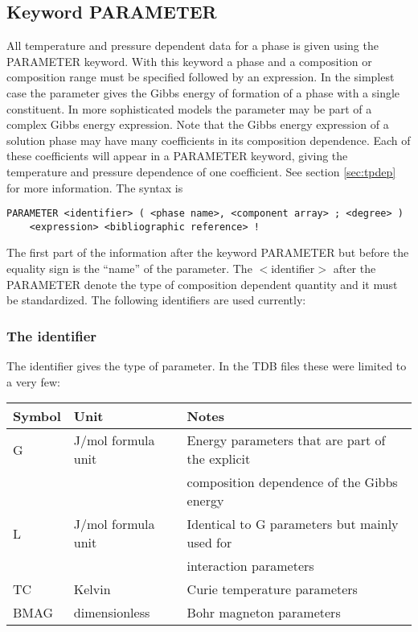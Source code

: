\documentclass[12pt]{article}
\begin{document}
\subsection{Keyword PARAMETER}\label{sec:parameter}

All temperature and pressure dependent data for a phase is given using
the PARAMETER keyword.  With this keyword a phase and a composition or
composition range must be specified followed by an expression.  In the
simplest case the parameter gives the Gibbs energy of formation of a
phase with a single constituent.  In more sophisticated models the
parameter may be part of a complex Gibbs energy expression.  Note that
the Gibbs energy expression of a solution phase may have many
coefficients in its composition dependence.  Each of these
coefficients will appear in a PARAMETER keyword, giving the
temperature and pressure dependence of one coefficient.  See section
\ref{sec:tpdep} for more information.  The syntax is

\begin{verbatim}
PARAMETER <identifier> ( <phase name>, <component array> ; <degree> )
    <expression> <bibliographic reference> !
\end{verbatim}

The first part of the information after the keyword PARAMETER but
before the equality sign is the ``name'' of the parameter.  The
$<$identifier$>$ after the PARAMETER denote the type of composition
dependent quantity and it must be standardized.  The following
identifiers are used currently:

\subsubsection{The identifier}\label{sec:tdbid}

The identifier gives the type of parameter.  In the TDB files these
were limited to a very few:

\begin{tabular}{lll}
Symbol & Unit &      Notes\\\hline
G      & J/mol formula unit & Energy parameters that are part of the explicit\\
 && composition dependence of the Gibbs energy\\
L     & J/mol formula unit & Identical to G parameters but mainly used for\\
 && interaction parameters\\
TC    & Kelvin & Curie temperature parameters\\
BMAG & dimensionless & Bohr magneton parameters\\\hline
\end{tabular}
\end{document}

